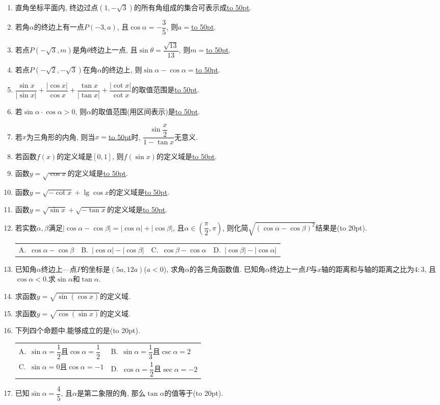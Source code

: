\documentclass[10pt,a4paper]{article}
\newcommand{\blank}[1]{\underline{\hbox to #1pt{}}}
\newcommand{\bracket}[1]{(\hbox to #1pt{})}
\newcommand{\twoch}[4]{\par\begin{tabular}{p{.46\textwidth}p{.46\textwidth}}
A.~#1& B.~#2\\
C.~#3& D.~#4
\end{tabular}}
\newcommand{\fourch}[4]{\par\begin{tabular}{p{.23\textwidth}p{.23\textwidth}p{.23\textwidth}p{.23\textwidth}}
A.~#1 &B.~#2& C.~#3& D.~#4
\end{tabular}}
\begin{document}
\begin{enumerate}[1.]
\fourch{第一或第二象限角}{第二或第四象限角}{第一或第三象限角}{第二或第三象限角}
\item 直角坐标平面内, 终边过点$(1,-\sqrt 3)$的所有角组成的集合可表示成\blank{50}.
\item 若角$\alpha$的终边上有一点$P(-3,a)$, 且$\cos \alpha =-\dfrac 35$, 则$a=$\blank{50}.
\item 若点$P(-\sqrt 3,m)$是角$\theta$终边上一点, 且$\sin \theta =\dfrac{\sqrt {13}}{13}$, 则$m=$\blank{50}.
\item 若点$P(-\sqrt 2,-\sqrt 3)$在角$\alpha$的终边上, 则$\sin \alpha -\cos \alpha =$\blank{50}.
\item $\dfrac{\sin x}{|\sin x|}+\dfrac{|\cos x|}{\cos x}+\dfrac{\tan x}{|\tan x|}+\dfrac{|\cot x|}{\cot x}$的取值范围是\blank{50}.
\item 若$\sin \alpha \cdot \cos \alpha >0$, 则$\alpha$的取值范围(用区间表示)是\blank{50}.
\item 若$x$为三角形的内角, 则当$x=$\blank{50}时, $\dfrac{\sin \dfrac x2}{1-\tan x}$无意义.
\item 若函数$f(x)$的定义域是$[0, 1]$, 则$f(\sin x)$的定义域是\blank{50}.
\item 函数$y=\sqrt {\cos x}$的定义域是\blank{50}.
\item 函数$y=\sqrt {-\cot x}+\lg \cos x$的定义域是\blank{50}.
\item 函数$y=\sqrt {\sin x}+\sqrt {-\tan x}$的定义域是\blank{50}.
\item 若实数$\alpha ,\beta$满足$|\cos \alpha -\cos \beta|=|\cos \alpha|+|\cos \beta|$, 且$\alpha \in (\dfrac{\pi}2,\pi)$, 则化简$\sqrt {(\cos \alpha -\cos \beta)^2}$结果是\bracket{20}.
\fourch{$\cos \alpha -\cos \beta$}{$|\cos \alpha|-|\cos \beta|$}{$\cos \beta -\cos \alpha$}{$|\cos \beta|-|\cos \alpha|$}
\item 已知角$\alpha$终边上—点$P$的坐标是$(5a,12a)$($a<0$), 求角$\alpha$的各三角函数值.
已知角$\alpha$终边上一点$P$与$x$轴的距离和与轴的距离之比为$4:3$, 且$\cos \alpha <0$.求$\sin \alpha$和$\tan \alpha$.
\item 求函数$y=\sqrt {\sin (\cos x)}$的定义域.
\item 求函数$y=\sqrt {\cos (\sin x)}$的定义域.
\item 下列四个命题中.能够成立的是\bracket{20}.
\twoch{$\sin \alpha =\dfrac 12$且$\cos \alpha =\dfrac 12$}{$\sin \alpha =\dfrac 13$且$\csc \alpha =2$}{$\sin \alpha =0$且$\cos \alpha =-1$}{$\cos \alpha =\dfrac 12$且$\sec \alpha =-2$}
\item 已知$\sin \alpha =\dfrac 45$, 且$\alpha$是第二象限的角, 那么$\tan \alpha$的值等于\bracket{20}.

\end{enumerate}
\end{document}
